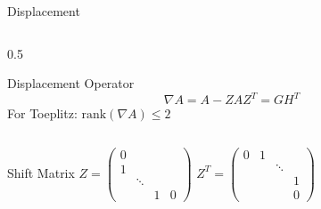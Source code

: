 \begin{frame}{Displacement}

  \begin{columns}

    \begin{column}{0.5\textwidth}

      \begin{block}{Displacement Operator}
        \[
          \nabla A = A - Z A Z^T = G H^T
        \]
        For Toeplitz: $\mathrm{rank}(\nabla A) \leq 2$
      \end{block}

    \end{column}
  \end{columns}

  \vspace{1em}


  \begin{block}{Shift Matrix}
    \centering
    $Z =
    \begin{pmatrix}
      0       &           &   &  \\
      1       &           &   &  \\
      & \ddots    &   &  \\
      &           & 1 & 0
    \end{pmatrix}$
    \quad
    $Z^{T} =
    \begin{pmatrix}
      0       & 1         &       &  \\
      &           &\ddots &  \\
      &           &       & 1\\
      &           &       & 0
    \end{pmatrix}$
  \end{block}

\end{frame}
